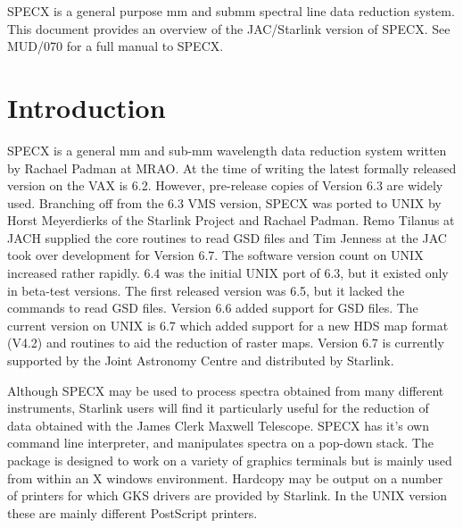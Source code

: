 \documentclass[twoside,11pt]{article}
\newcommand{\stardocinitials}  {SUN}
\newcommand{\stardocnumber}    {17.8}
\newcommand{\stardocabstract}  {SPECX is a general purpose mm and submm
spectral line data reduction system. This document provides an overview
of the JAC/Starlink version of SPECX. See MUD/070 for a full manual to
SPECX.}
\newcommand{\stardocname}{\stardocinitials /\stardocnumber}
\newcommand{\htmladdnormallink}[2]{#1}
\newenvironment{latexonly}{}{}
\newcommand{\xref}[3]{#1}
\renewcommand{\_}{\texttt{\symbol{95}}}
\renewcommand{\thepage}{\roman{page}}
\begin{document}
\stardocabstract
  \newpage
  \begin{latexonly}
    \setlength{\parskip}{0mm}
    \tableofcontents
    \setlength{\parskip}{\medskipamount}
    \markboth{\stardocname}{\stardocname}
  \end{latexonly}
\cleardoublepage
\renewcommand{\thepage}{\arabic{page}}
\setcounter{page}{1}

\section {Introduction}

SPECX is a general mm and sub-mm wavelength data reduction system written by
Rachael Padman at \htmladdnormallink{MRAO}{http://www.mrao.cam.ac.uk}. At the
time of writing the latest formally released version on the VAX is 6.2.
However, pre-release copies of Version 6.3 are widely used. Branching off from
the 6.3 VMS version, SPECX was ported to UNIX by Horst Meyerdierks of the
\htmladdnormallink{Starlink Project}{http://www.starlink.ac.uk} and Rachael
Padman. Remo Tilanus at JACH supplied the core routines to read GSD files and
Tim Jenness at the JAC took over development for Version 6.7. The software
version count on UNIX increased rather rapidly. 6.4 was the initial UNIX port
of 6.3, but it existed only in beta-test versions. The first released version
was 6.5, but it lacked the commands to read \xref{GSD}{sun229}{} files.
Version 6.6 added support for \xref{GSD}{sun229}{} files. The current version
on UNIX is 6.7 which added support for a new \xref{HDS}{sun92}{} map format
(V4.2) and routines to aid the reduction of raster maps. Version 6.7 is
currently supported by the Joint Astronomy Centre and distributed by Starlink.

Although SPECX may be used to process spectra obtained from many different
instruments, Starlink users will find it particularly useful for the reduction
of data obtained with the James Clerk Maxwell Telescope.  SPECX has it's own
command line interpreter, and manipulates spectra on a pop-down stack.  The
package is designed to work on a variety of graphics terminals but is mainly
used from within an X windows environment. Hardcopy may be output on a number
of printers for which \xref{GKS}{sun83}{} drivers are provided by Starlink. In
the UNIX version these are mainly different PostScript printers.
\end{document}
